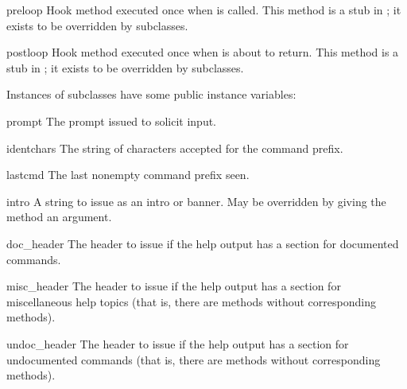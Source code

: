 \begin{methoddesc}[Cmd]{preloop}{}
Hook method executed once when  is called.  This
method is a stub in ; it exists to be overridden by
subclasses.
\end{methoddesc}

\begin{methoddesc}[Cmd]{postloop}{}
Hook method executed once when  is about to return.
This method is a stub in ; it exists to be overridden by
subclasses.
\end{methoddesc}

Instances of  subclasses have some public instance variables:

\begin{memberdesc}[Cmd]{prompt}
The prompt issued to solicit input.
\end{memberdesc}

\begin{memberdesc}[Cmd]{identchars}
The string of characters accepted for the command prefix.
\end{memberdesc}

\begin{memberdesc}[Cmd]{lastcmd}
The last nonempty command prefix seen. 
\end{memberdesc}

\begin{memberdesc}[Cmd]{intro}
A string to issue as an intro or banner.  May be overridden by giving
the  method an argument.
\end{memberdesc}

\begin{memberdesc}[Cmd]{doc_header}
The header to issue if the help output has a section for documented
commands.
\end{memberdesc}

\begin{memberdesc}[Cmd]{misc_header}
The header to issue if the help output has a section for miscellaneous 
help topics (that is, there are  methods without
corresponding  methods).
\end{memberdesc}

\begin{memberdesc}[Cmd]{undoc_header}
The header to issue if the help output has a section for undocumented 
commands (that is, there are  methods without
corresponding  methods).
\end{memberdesc}

